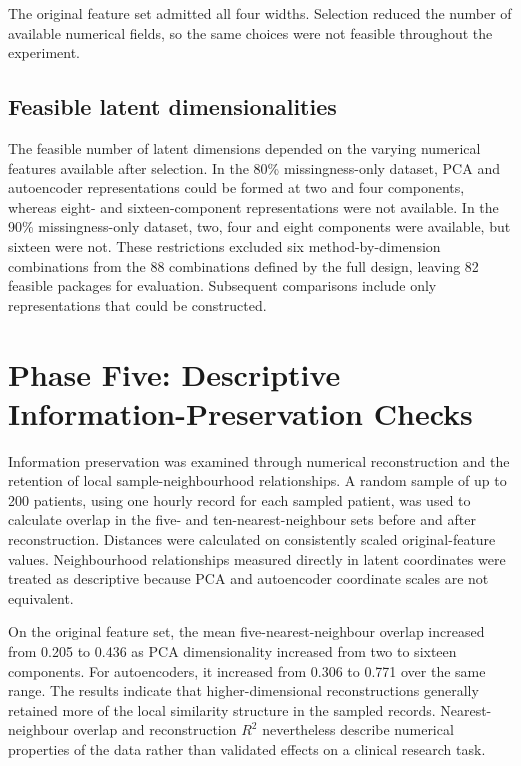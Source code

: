 \noindent The original feature set admitted all four widths. Selection reduced the number of available numerical fields, so the same choices were not feasible throughout the experiment.

\subsection{Feasible latent dimensionalities}\label{feasible-latent-dimensionalities}

The feasible number of latent dimensions depended on the varying
numerical features available after selection. In the 80\%
missingness-only dataset, PCA and autoencoder representations could be
formed at two and four components, whereas eight- and sixteen-component
representations were not available. In the 90\% missingness-only
dataset, two, four and eight components were available, but sixteen were
not. These restrictions excluded six method-by-dimension combinations
from the 88 combinations defined by the full design, leaving 82 feasible
packages for evaluation. Subsequent comparisons include only
representations that could be constructed.

\section{Phase Five: Descriptive Information-Preservation
	Checks}\label{phase-five-descriptive-information-preservation-checks}

Information preservation was examined through numerical reconstruction
and the retention of local sample-neighbourhood relationships. A random
sample of up to 200 patients, using one hourly record for each sampled
patient, was used to calculate overlap in the five- and
ten-nearest-neighbour sets before and after reconstruction. Distances
were calculated on consistently scaled original-feature values.
Neighbourhood relationships measured directly in latent coordinates were
treated as descriptive because PCA and autoencoder coordinate scales are
not equivalent.

On the original feature set, the mean five-nearest-neighbour overlap
increased from 0.205 to 0.436 as PCA dimensionality increased from two
to sixteen components. For autoencoders, it increased from 0.306 to
0.771 over the same range. The results indicate that higher-dimensional
reconstructions generally retained more of the local similarity
structure in the sampled records. Nearest-neighbour overlap and
reconstruction \(R^2\) nevertheless describe numerical properties of the data
rather than validated effects on a clinical research task.

